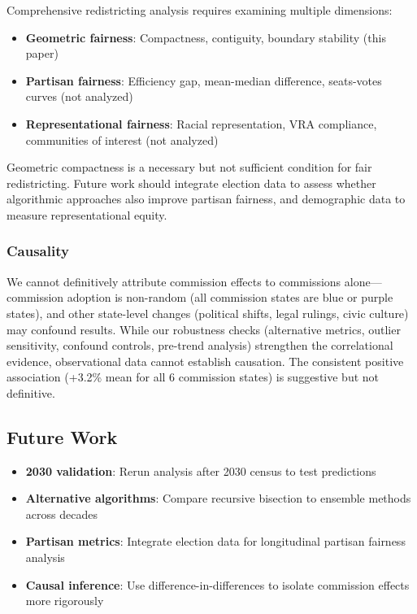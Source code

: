 Comprehensive redistricting analysis requires examining multiple dimensions:
\begin{itemize}
    \item \textbf{Geometric fairness}: Compactness, contiguity, boundary stability (this paper)
    \item \textbf{Partisan fairness}: Efficiency gap, mean-median difference, seats-votes curves (not analyzed)
    \item \textbf{Representational fairness}: Racial representation, VRA compliance, communities of interest (not analyzed)
\end{itemize}

Geometric compactness is a necessary but not sufficient condition for fair redistricting. Future work should integrate election data to assess whether algorithmic approaches also improve partisan fairness, and demographic data to measure representational equity.

\subsubsection{Causality}

We cannot definitively attribute commission effects to commissions alone—commission adoption is non-random (all commission states are blue or purple states), and other state-level changes (political shifts, legal rulings, civic culture) may confound results. While our robustness checks (alternative metrics, outlier sensitivity, confound controls, pre-trend analysis) strengthen the correlational evidence, observational data cannot establish causation. The consistent positive association (+3.2\% mean for all 6 commission states) is suggestive but not definitive.

\subsection{Future Work}

\begin{itemize}
    \item \textbf{2030 validation}: Rerun analysis after 2030 census to test predictions
    \item \textbf{Alternative algorithms}: Compare recursive bisection to ensemble methods across decades
    \item \textbf{Partisan metrics}: Integrate election data for longitudinal partisan fairness analysis
    \item \textbf{Causal inference}: Use difference-in-differences to isolate commission effects more rigorously
\end{itemize}
